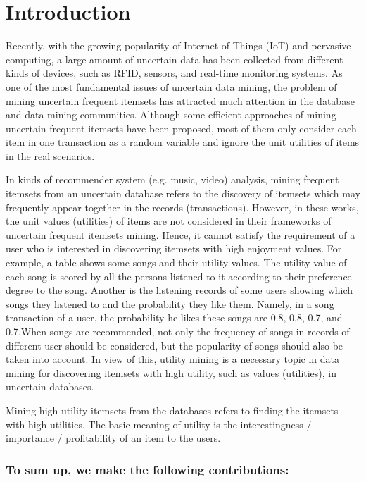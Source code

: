 \documentclass[conference]{IEEEtran}
\begin{document}
\section{Introduction}
Recently, with the growing popularity of Internet of Things (IoT) and pervasive computing, a large amount of uncertain data has been collected from different kinds of devices, such as RFID, sensors, and real-time monitoring systems. As one of the most fundamental issues of uncertain data mining, the problem of mining uncertain frequent itemsets has attracted much attention in the database and data mining communities. Although some efficient approaches of mining uncertain frequent itemsets have been proposed, most of them only consider each item in one transaction as a random variable and ignore the unit utilities of items in the real scenarios.

In kinds of recommender system (e.g. music, video) analysis, mining frequent itemsets from an uncertain database refers to the discovery of itemsets which may frequently appear together in the records (transactions). However, in these works, the unit values (utilities) of items are not considered in their frameworks of uncertain frequent itemsets mining. Hence, it cannot satisfy the requirement of a user who is interested in discovering itemsets with high enjoyment values. For example, a table shows some songs and their utility values. The utility value of each song is scored by all the persons listened to it according to their preference degree to the song. Another is the listening records of some users showing which songs they listened to and the probability they like them. Namely, in a song transaction of a user, the probability he likes these songs are 0.8, 0.8, 0.7, and 0.7.When songs are recommended, not only the frequency of songs in records of different user should be considered, but the popularity of songs should also be taken into account. In view of this, utility mining is a necessary topic in data mining for discovering itemsets with high utility, such as values (utilities), in uncertain databases.

Mining high utility itemsets from the databases refers to finding the itemsets with high utilities. The basic meaning of utility is the interestingness / importance / profitability of an item to the users.

\vspace{-0.1cm}
\subsubsection*{To sum up, we make the following contributions:}
\end{document}
